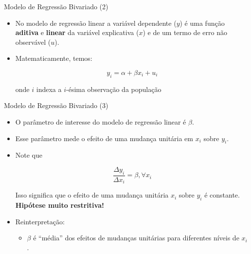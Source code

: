 \documentclass[10pt,slides,xcolor=pdftex,dvipsnames,table]{beamer}
\begin{document}
\begin{frame}{Modelo de Regressão Bivariado (2)}
    
     \begin{itemize}\itemsep1.2em            

     \item No modelo de regressão linear a variável dependente ($y$) é uma função \textbf{aditiva} e \textbf{linear} da variável explicativa ($x$) e de um termo de erro não observável ($u$).
     
     \item Matematicamente, temos:
    
    $$ y_i = \alpha + \beta x_i + u_i $$
    
\vspace*{0.2cm}     
    
    onde $i$ indexa a $i$-ésima observação da população
    
\vspace*{0.2cm}        
     
    \end{itemize}
    
\end{frame}


\begin{frame}{Modelo de Regressão Bivariado (3)}
    
     \begin{itemize}\itemsep1.2em                 

	\item O parâmetro de interesse do modelo de regressão linear é $\beta$.
	
	\item Esse parâmetro mede o efeito de uma mudança unitária em $x_i$ sobre $y_i$. 
	
	\item Note que
	
	$$ \frac{\Delta y_i}{\Delta x_i} = \beta, \forall x_i $$ 
	
	\vspace*{0.2cm}
	
	Isso significa que o efeito de uma mudança unitária $x_i$ sobre $y_i$ é constante. \textbf{Hipótese muito restritiva!}	
	
	\item Reinterpretação: 
	
	\begin{itemize}
	\item $\beta$ é ``média'' dos efeitos de mudanças unitárias para diferentes níveis de $x_i$. 
	\end{itemize}	   
     
    \end{itemize}
    
\end{frame}
\end{document}
